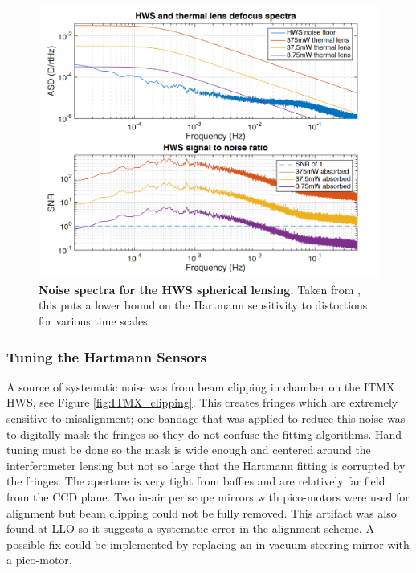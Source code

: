 	\begin{figure}[!]
	\centering
	\includegraphics[width=0.75\textheight]{../Figures/HWS_Noise.PNG}
	\caption[Noise spectra for the HWS spherical lensing.] 
	{\textbf{Noise spectra for the HWS spherical lensing.} Taken from \cite{AWC_current}, this puts a lower bound on the Hartmann sensitivity to distortions for various time scales.}
	\label{fig:HWS_spectra}
	\end{figure}
	
	\subsubsection{Tuning the Hartmann Sensors}
	A source of systematic noise was from beam clipping in chamber on the ITMX HWS, see Figure \ref{fig:ITMX_clipping}. This creates fringes which are extremely sensitive to misalignment; one bandage that was applied to reduce this noise was to digitally mask the fringes so they do not confuse the fitting algorithms.  Hand tuning must be done so the mask is wide enough and centered around the interferometer lensing but not so large that the Hartmann fitting is corrupted by the fringes.  The aperture is very tight from baffles and are relatively far field from the CCD plane.  Two in-air periscope mirrors with pico-motors were used for alignment but beam clipping could not be fully removed.  This artifact was also found at LLO so it suggests a systematic error in the alignment scheme.  A possible fix could be implemented by replacing an in-vacuum steering mirror with a pico-motor.
	
